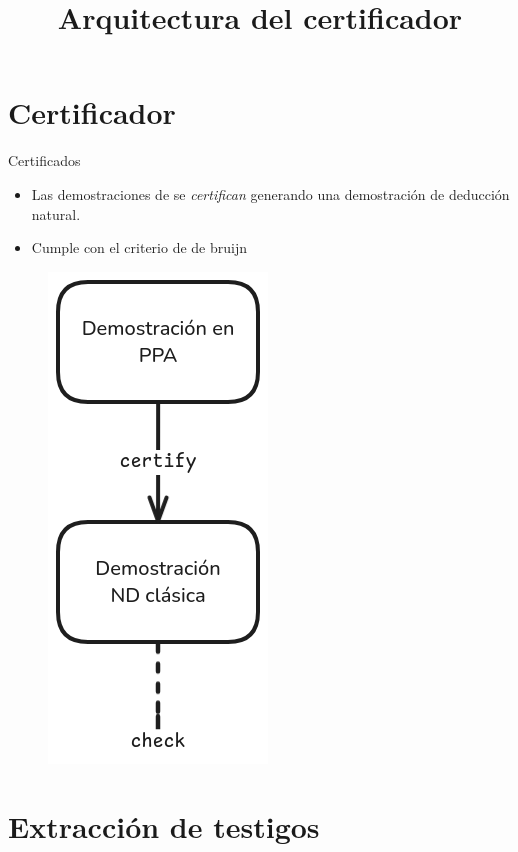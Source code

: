 \documentclass[xcolor={dvipsnames},spanish]{beamer}
\begin{document}
\section{Certificador}

\begin{frame}{Certificados}
    \begin{itemize}
        \item Las demostraciones de \ppaLang se \textit{certifican} generando
        una demostración de deducción natural.
        \item Cumple con el criterio de de bruijn 
    \end{itemize}

    \begin{figure}
        \includegraphics[scale=0.2]{img/ppt/certify.png}
        \centering
        \title{Arquitectura del certificador}
    \end{figure}
\end{frame}

\section{Extracción de testigos}


\end{document}
